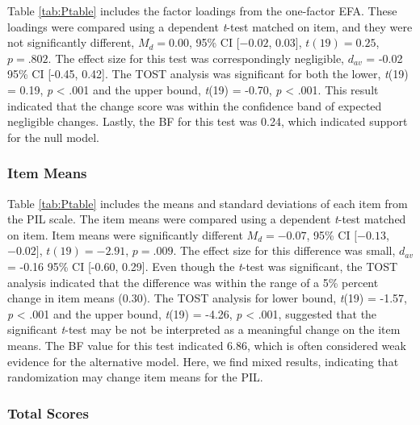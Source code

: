 \documentclass[english,man]{apa6}
\theoremstyle{definition}
\theoremstyle{definition}
\theoremstyle{definition}
\theoremstyle{remark}
\begin{document}
Table \ref{tab:Ptable} includes the factor loadings from the one-factor
EFA. These loadings were compared using a dependent \emph{t}-test
matched on item, and they were not significantly different,
\(M_d = 0.00\), 95\% CI \([-0.02\), \(0.03]\), \(t(19) = 0.25\),
\(p = .802\). The effect size for this test was correspondingly
negligible, \(d_{av}\) = -0.02 95\% CI {[}-0.45, 0.42{]}. The TOST
analysis was significant for both the lower, \emph{t}(19) = 0.19,
\emph{p} \textless{} .001 and the upper bound, \emph{t}(19) = -0.70,
\emph{p} \textless{} .001. This result indicated that the change score
was within the confidence band of expected negligible changes. Lastly,
the BF for this test was 0.24, which indicated support for the null
model.

\subsubsection{Item Means}\label{item-means}

Table \ref{tab:Ptable} includes the means and standard deviations of
each item from the PIL scale. The item means were compared using a
dependent \emph{t}-test matched on item. Item means were significantly
different \(M_d = -0.07\), 95\% CI \([-0.13\), \(-0.02]\),
\(t(19) = -2.91\), \(p = .009\). The effect size for this difference was
small, \(d_{av}\) = -0.16 95\% CI {[}-0.60, 0.29{]}. Even though the
\emph{t}-test was significant, the TOST analysis indicated that the
difference was within the range of a 5\% percent change in item means
(0.30). The TOST analysis for lower bound, \emph{t}(19) = -1.57,
\emph{p} \textless{} .001 and the upper bound, \emph{t}(19) = -4.26,
\emph{p} \textless{} .001, suggested that the significant \emph{t}-test
may be not be interpreted as a meaningful change on the item means. The
BF value for this test indicated 6.86, which is often considered weak
evidence for the alternative model. Here, we find mixed results,
indicating that randomization may change item means for the PIL.

\subsubsection{Total Scores}\label{total-scores}
\end{document}
